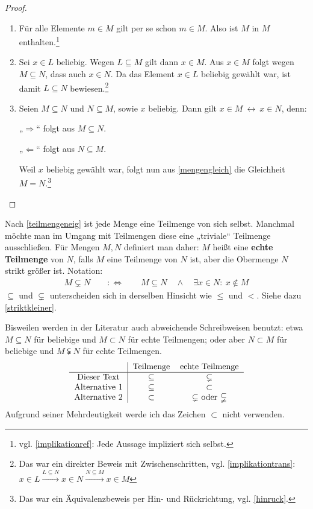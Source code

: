 \begin{proof}
    \begin{enumerate}
        \item Für alle Elemente $m\in M$ gilt per se schon $m\in M$. Also ist $M$ in $M$ enthalten.\footnote{vgl. \cref{implikationref}: Jede Aussage impliziert sich selbst.}
        \item Sei $x\in L$ beliebig. Wegen $L\subseteq M$ gilt dann $x\in M$. Aus $x\in M$ folgt wegen $M\subseteq N$, dass auch $x\in N$. Da das Element $x\in L$ beliebig gewählt war, ist damit $L\subseteq N$ bewiesen.\footnote{Das war ein direkter Beweis mit Zwischenschritten, vgl. \cref{implikationtrans}: $x\in L\xrightarrow{L\subseteq N} x\in N \xrightarrow{N\subseteq M} x\in M$}
        \item Seien $M\subseteq N$ und $N\subseteq M$, sowie $x$ beliebig. Dann gilt $x\in M\ \leftrightarrow\ x\in N$, denn:

        „$\Rightarrow$“ folgt aus $M\subseteq N$.

        „$\Leftarrow$“ folgt aus $N\subseteq M$.

        Weil $x$ beliebig gewählt war, folgt nun aus \cref{mengengleich} die Gleichheit $M=N$.\footnote{Das war ein Äquivalenzbeweis per Hin- und Rückrichtung, vgl. \cref{hinruck}.} \qedhere
    \end{enumerate}
\end{proof}


\begin{nota}
    Nach \cref{teilmengeneig} ist jede Menge eine Teilmenge von sich selbst. Manchmal möchte man im Umgang mit Teilmengen diese eine „triviale“ Teilmenge ausschließen. Für Mengen $M,N$ definiert man daher: $M$ heißt eine \textbf{echte Teilmenge} von $N$, falls $M$ eine Teilmenge von $N$ ist, aber die Obermenge $N$ strikt größer ist. Notation:
        \begin{align*}
            M\subsetneq N \qquad:\Leftrightarrow\qquad M\subseteq N\quad \land\quad \exists x\in N:\ x\notin M
        \end{align*}
    $\subseteq$ und $\subsetneq$ unterscheiden sich in derselben Hinsicht wie $\le$ und $<$. Siehe dazu \cref{striktkleiner}.

    Bisweilen werden in der Literatur auch abweichende Schreibweisen benutzt: etwa $M\subseteq N$ für beliebige und $M\subset N$ für echte Teilmengen; oder aber $N\subset M$ für beliebige und $M\subsetneqq N$ für echte Teilmengen.
    \[\begin{tabular}{c|ccc}
        & Teilmenge & echte Teilmenge \\ \hline
        Dieser Text & $\subseteq$ & $\subsetneq$ \\
        Alternative 1 & $\subseteq$ & $\subset$ \\
        Alternative 2 & $\subset$ & $\subsetneq$ oder $\subsetneqq$
    \end{tabular}\]
    Aufgrund seiner Mehrdeutigkeit werde ich das Zeichen $\subset$ nicht verwenden.
\end{nota}


